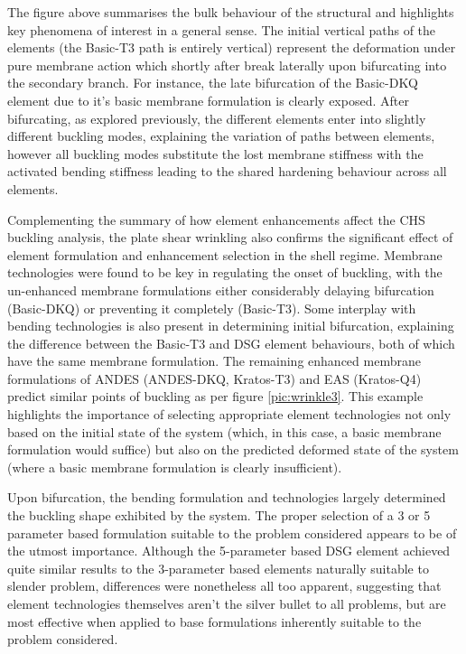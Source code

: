 The figure above summarises the bulk behaviour of the structural and highlights key phenomena of interest in a general sense. The initial vertical paths of the elements (the Basic-T3 path is entirely vertical) represent the deformation under pure membrane action which shortly after break laterally upon bifurcating into the secondary branch. For instance, the late bifurcation of the Basic-DKQ element due to it's basic membrane formulation is clearly exposed. After bifurcating, as explored previously, the different elements enter into slightly different buckling modes, explaining the variation of paths between elements, however all buckling modes substitute the lost membrane stiffness with the activated bending stiffness leading to the shared hardening behaviour across all elements.

Complementing the summary of how element enhancements affect the CHS buckling analysis, the plate shear wrinkling also confirms the significant effect of element formulation and enhancement selection in the shell regime. Membrane technologies were found to be key in regulating the onset of buckling, with the un-enhanced membrane formulations either considerably delaying bifurcation (Basic-DKQ) or preventing it completely (Basic-T3). Some interplay with bending technologies is also present in determining initial bifurcation, explaining the difference between the Basic-T3 and DSG element behaviours, both of which have the same membrane formulation. The remaining enhanced membrane formulations of ANDES (ANDES-DKQ, Kratos-T3) and EAS (Kratos-Q4) predict similar points of buckling as per figure \ref{pic:wrinkle3}. This example highlights the importance of selecting appropriate element technologies not only based on the initial state of the system (which, in this case, a basic membrane formulation would suffice) but also on the predicted deformed state of the system (where a basic membrane formulation is clearly insufficient).

 Upon bifurcation, the bending formulation and technologies largely determined the buckling shape exhibited by the system. The proper selection of a 3 or 5 parameter based formulation suitable to the problem considered appears to be of the utmost importance. Although the 5-parameter based DSG element achieved quite similar results to the 3-parameter based elements naturally suitable to slender problem, differences were nonetheless all too apparent, suggesting that element technologies themselves aren't the silver bullet to all problems, but are most effective when applied to base formulations inherently suitable to the problem considered.
 
